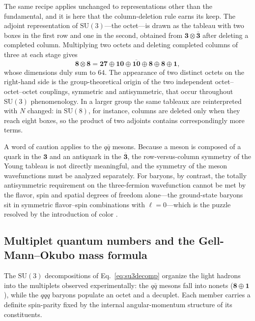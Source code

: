 The same recipe applies unchanged to representations other than the fundamental, and it
is here that the column-deletion rule earns its keep. The adjoint representation of
$\mathrm{SU}(3)$---the octet---is drawn as the tableau with two boxes in the first row and
one in the second, obtained from $\mathbf{3}\otimes\overline{\mathbf{3}}$ after deleting a
completed column. Multiplying two octets and deleting completed columns of three at each
stage gives
\begin{equation}
    \mathbf{8} \otimes \mathbf{8}
    = \mathbf{27} \oplus \mathbf{10} \oplus \overline{\mathbf{10}}
      \oplus \mathbf{8} \oplus \mathbf{8} \oplus \mathbf{1},
    \label{eq:8x8}
\end{equation}
whose dimensions duly sum to $64$. The appearance of two distinct octets on the
right-hand side is the group-theoretical origin of the two independent
octet--octet--octet couplings, symmetric and antisymmetric, that occur throughout
$\mathrm{SU}(3)$ phenomenology. In a larger group the same tableaux are reinterpreted
with $N$ changed: in $\mathrm{SU}(8)$, for instance, columns are deleted only when they
reach eight boxes, so the product of two adjoints contains correspondingly more terms.

A word of caution applies to the $q\bar q$ mesons. Because a meson is composed of a
quark in the $\mathbf{3}$ and an antiquark in the $\overline{\mathbf{3}}$, the row-versus-column
symmetry of the Young tableau is not directly meaningful, and the symmetry of the
meson wavefunctions must be analyzed separately. For baryons, by contrast, the totally
antisymmetric requirement on the three-fermion wavefunction cannot be met by the
flavor, spin and spatial degrees of freedom alone---the ground-state baryons sit in
symmetric flavor--spin combinations with $\ell = 0$---which is the puzzle resolved by
the introduction of color \cite[Ch.~6]{Amsler2018}.

\subsection{Multiplet quantum numbers and the Gell-Mann--Okubo mass formula}
\label{subsec:gmo}

The $\mathrm{SU}(3)$ decompositions of Eq.~\eqref{eq:su3decomp} organize the light
hadrons into the multiplets observed experimentally: the $q\bar q$ mesons fall into
nonets ($\mathbf{8}\oplus\mathbf{1}$), while the $qqq$ baryons populate an octet and
a decuplet. Each member carries a definite spin-parity fixed by the internal
angular-momentum structure of its constituents.

